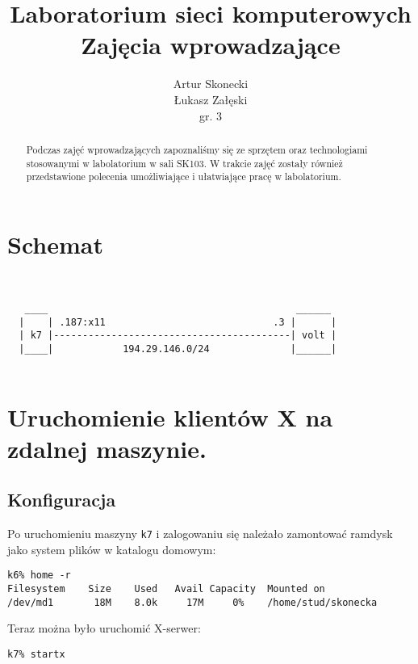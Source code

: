 \documentclass[a4paper,11pt,notitlepage]{article}
\title{\textbf{Laboratorium sieci komputerowych\\Zajęcia wprowadzające}}
\author{Artur Skonecki\\Łukasz Załęski\\gr. 3}
\begin{document}
\maketitle
\begin{abstract}
\noindent
\large
Podczas zajęć wprowadzających zapoznaliśmy się ze sprzętem oraz technologiami stosowanymi w labolatorium w sali SK103. W trakcie zajęć zostały również przedstawione polecenia umożliwiające i ułatwiające pracę w labolatorium.
\end{abstract}



\section{Schemat}
\begin{verbatim}


   ____                                           ______
  |    | .187:x11                             .3 |      |
  | k7 |-----------------------------------------| volt |
  |____|            194.29.146.0/24              |______|


\end{verbatim}


\section{Uruchomienie klientów X na zdalnej maszynie.}


\subsection{Konfiguracja}
Po uruchomieniu maszyny \texttt{k7} i zalogowaniu się należało zamontować ramdysk jako system plików w katalogu domowym:
\begin{verbatim}
k6% home -r
Filesystem    Size    Used   Avail Capacity  Mounted on
/dev/md1       18M    8.0k     17M     0%    /home/stud/skonecka
\end{verbatim}
Teraz można było uruchomić X-serwer:
\begin{verbatim}
k7% startx
\end{verbatim}
\end{document}
